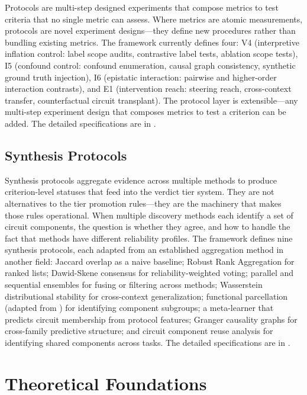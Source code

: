 \documentclass{article}
\begin{document}
Protocols are multi-step designed experiments that compose metrics to test criteria that no single metric can assess. Where metrics are atomic measurements, protocols are novel experiment designs---they define new procedures rather than bundling existing metrics. The framework currently defines four: V4 (interpretive inflation control: label scope audits, contrastive label tests, ablation scope tests), I5 (confound control: confound enumeration, causal graph consistency, synthetic ground truth injection), I6 (epistatic interaction: pairwise and higher-order interaction contrasts), and E1 (intervention reach: steering reach, cross-context transfer, counterfactual circuit transplant). The protocol layer is extensible---any multi-step experiment design that composes metrics to test a criterion can be added. The detailed specifications are in .

\subsection{Synthesis Protocols}
\label{sec:methodology-synthesis}

Synthesis protocols aggregate evidence across multiple methods to produce criterion-level statuses that feed into the verdict tier system. They are not alternatives to the tier promotion rules---they are the machinery that makes those rules operational. When multiple discovery methods each identify a set of circuit components, the question is whether they agree, and how to handle the fact that methods have different reliability profiles. The framework defines nine synthesis protocols, each adapted from an established aggregation method in another field: Jaccard overlap as a naive baseline; Robust Rank Aggregation \citep{kolde2012robust} for ranked lists; Dawid-Skene consensus \citep{dawid1979maximum} for reliability-weighted voting; parallel and sequential ensembles for fusing or filtering across methods; Wasserstein distributional stability for cross-context generalization; functional parcellation (adapted from \citealp{glasser2016multi}) for identifying component subgroups; a meta-learner that predicts circuit membership from protocol features; Granger causality graphs for cross-family predictive structure; and circuit component reuse analysis \citep{merullo2024circuit} for identifying shared components across tasks. The detailed specifications are in .

\section{Theoretical Foundations}
\label{sec:foundations}
\end{document}
